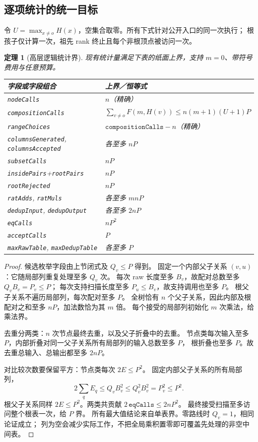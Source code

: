 \documentclass[UTF8,a4paper,11pt]{ctexart}
\newtheorem{theorem}{定理}[section]
\theoremstyle{definition}
\begin{document}
\subsection{逐项统计的统一目标}
令 $U=\max_{x\ne o}H(x)$，空集合取零。所有下式针对公开入口的同一次执行；
根孩子仅计算一次，祖先 rank 终止且每个非根顶点被访问一次。
\begin{theorem}[高层逻辑统计界]
现有统计量满足下表的纸面上界，支持 $m=0$、带符号费用与任意预算。
\begin{center}
\begin{tabular}{ll}
\toprule 字段或字段组合 & 上界／恒等式 \\ \midrule
\texttt{nodeCalls} & $n$（精确） \\
\texttt{compositionCalls} & $\sum_{v\ne o}F(m,H(v))\le n(m+1)(U+1)P$ \\
\texttt{rangeChoices} & $\texttt{compositionCalls}-n$（精确） \\
\texttt{columnsGenerated}, \texttt{columnsAccepted} & 各至多 $nP$ \\
\texttt{subsetCalls} & $nP$ \\
\texttt{insidePairs}+\texttt{rootPairs} & $nP$ \\
\texttt{rootRejected} & $nP$ \\
\texttt{ratAdds}, \texttt{ratMuls} & 各至多 $mnP$ \\
\texttt{dedupInput}, \texttt{dedupOutput} & 各至多 $2nP$ \\
\texttt{eqCalls} & $nP^2$ \\
\texttt{acceptCalls} & $P$ \\
\texttt{maxRawTable}, \texttt{maxDedupTable} & 各至多 $P$ \\
\bottomrule
\end{tabular}
\end{center}
\end{theorem}
\begin{proof}
候选枚举字段由上节闭式及 $Q_v\le P$ 得到。
固定一个内部父子关系 $(v,u)$：它随局部列重复处理至多 $Q_v$ 次。
每次 raw 长度至多 $B_v$，故配对总数至多 $Q_vB_v=P_v\le P$；
每次支持扫描长度至多 $P_u\le B_v$，故支持调用也至多 $P$。
根父子关系不遍历局部列，每次配对至多 $P$。
全树恰有 $n$ 个父子关系，因此内部及根配对之和至多 $nP$，加法数恰为其 $m$ 倍。
每个接受的局部列初始化 $m$ 次乘法，给乘法界。

去重分两类：$n$ 次节点最终去重，以及父子折叠中的去重。
节点类每次输入至多 $P$，内部折叠对同一父子关系所有局部列的输入总数至多 $P$，
根折叠也至多 $P$。故去重总输入、总输出都至多 $2nP$。

对比较次数要保留平方：节点类每次 $2E\le P^2$。
固定内部父子关系的所有局部列，
\[
 2\sum_q E_q\le Q_vB_v^2\le Q_v^2B_v^2=P_v^2\le P^2.
\]
根父子关系同样 $2E\le P^2$。两类共贡献 $2\,\texttt{eqCalls}\le2nP^2$。
最终接受扫描至多访问整个根表一次，给 $P$ 界。
所有最大值结论来自单表界。零路线时 $Q_v=1$，相同论证成立；
列为空会减少实际工作，不把全局乘积置零即可覆盖先处理的非空中间表。
\end{proof}
\end{document}
